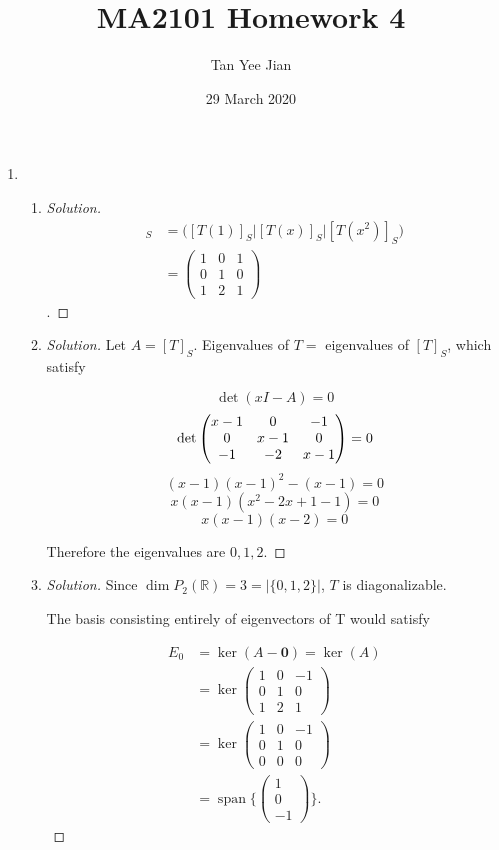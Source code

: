 \documentclass[12pt, a4paper]{article}
\title{MA2101 Homework 4}
\author{Tan Yee Jian}
\date{29 March 2020}
\newcommand{\pmat}[1]{ \begin{pmatrix}#1\end{pmatrix} }
\DeclareMathOperator{\spn}{span}
\begin{document}
\maketitle
\begin{enumerate}
  \item
    \begin{enumerate} %
      \item
        \begin{proof}[Solution]
          \begin{align*}
            [T]_S &= \bigg([T(1)]_S \bigg| [T(x)]_S \bigg| [T(x^2)]_S \bigg)\\
            &=\begin{pmatrix}
              1&0&1\\
              0&1&0\\
              1&2&1
            \end{pmatrix}
          \end{align*}
          .\end{proof}

      \item
        \begin{proof}[Solution]
          Let $A=[T]_S$. Eigenvalues of $T=$ eigenvalues of $[T]_S$, which
          satisfy

          \[ \det(xI-A)=0 \]
          \[ \det\begin{pmatrix}
              x-1&0&-1\\
              0&x-1&0\\
              -1&-2&x-1
            \end{pmatrix}=0\\ \]
          \[ (x-1)(x-1)^2-(x-1)=0 \]
          \[ x(x-1)(x^2-2x+1-1)=0\]
          \[ x(x-1)(x-2)=0 \]

          Therefore the eigenvalues are \(0,1,2\).
        \end{proof}

      \item
        \begin{proof}[Solution]
          Since $\dim P_2(\mathbb{R}) =3=|\{0,1,2\}|$, $T$ is
          diagonalizable.

          The basis consisting entirely of eigenvectors of T would satisfy


          \begin{align*}
            E_0 &= \ker(A-\mathbf{0})=\ker(A)\\
            &=\ker\pmat{1&0&-1\\0&1&0\\1&2&1}\\
            &=\ker\pmat{1&0&-1\\0&1&0\\0&0&0}\\
            &=\spn\big\{\pmat{1\\0\\-1}\big\}
            .\end{align*}


\end{proof}
\end{enumerate}
\end{enumerate}
\end{document}
